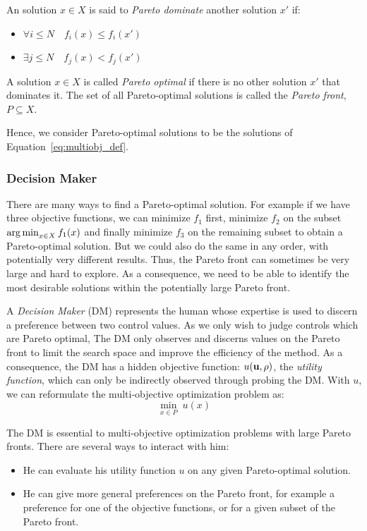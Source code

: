 			\begin{definition}\label{def:paretofront}
			An solution $x \in X$ is said to \emph{Pareto dominate} another solution $x'$ if:
				\begin{itemize}
						\item $\forall i \leq N \quad f_i(x) \leq f_i(x')$
						\item $\exists j \leq N \quad f_j(x) < f_j(x')$
				\end{itemize}
			A solution $x \in X$ is called \emph{Pareto optimal} if there is no other solution $x'$ that dominates it. The set of all Pareto-optimal solutions is called the \emph{Pareto front}, $P \subseteq X$.
			\end{definition}

			Hence, we consider Pareto-optimal solutions to be the solutions of Equation~\eqref{eq:multiobj_def}.

			\subsubsection{Decision Maker}
			There are many ways to find a Pareto-optimal solution. For example if we have three objective functions, we can minimize $f_1$ first, minimize $f_2$ on the subset $\operatorname*{arg\,min}_{x \in X} f_1(x)$ and finally minimize $f_3$ on the remaining subset to obtain a Pareto-optimal solution. But we could also do the same in any order, with potentially very different results. Thus, the Pareto front can sometimes be very large and hard to explore. As a consequence, we need to be able to identify the most desirable solutions within the potentially large Pareto front.

			
			A \emph{Decision Maker} (DM) represents the human whose expertise is used to discern a preference between two control values. As we only wish to judge controls which are Pareto optimal, The DM only observes and discerns values on the Pareto front to limit the search space and improve the efficiency of the method. As a consequence, the DM has a hidden objective function: $u\left(\vectorize{u}, \vectorize{\rho}\right)$, the \emph{utility function}, which can only be indirectly observed through probing the DM. With $u$, we can reformulate the multi-objective optimization problem as:
			\begin{equation}\label{eq:multiobj_dm}
					\min_{x\in P} \;u(x)
			\end{equation}

			The DM is essential to multi-objective optimization problems with large Pareto fronts.  There are several ways to interact with him:
			\begin{itemize}
				\item He can evaluate his utility function $u$ on any given Pareto-optimal solution.
				\item He can give more general preferences on the Pareto front, for example a preference for one of the objective functions, or for a given subset of the Pareto front.
			\end{itemize}

